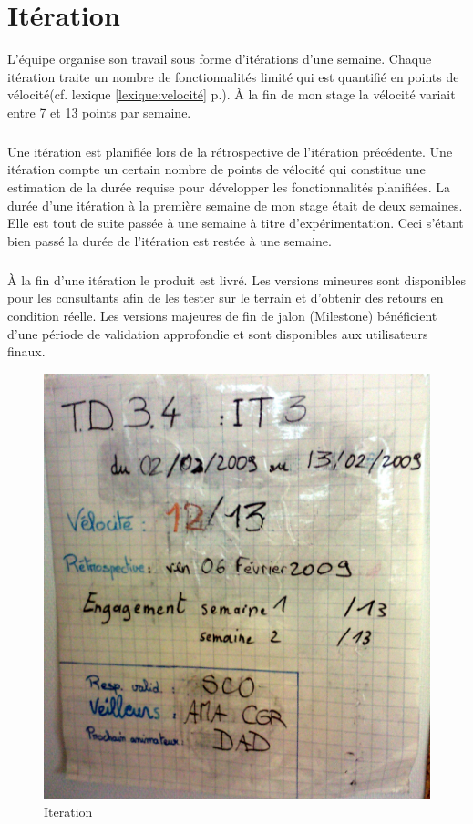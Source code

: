 \section{Itération}
L'équipe organise son travail sous forme d'itérations d'une semaine. Chaque itération traite un nombre de fonctionnalités limité qui est quantifié en points de vélocité(cf. lexique \ref{lexique:velocité} p.\pageref{lexique:velocité}). À la fin de mon stage la vélocité variait entre 7 et 13 points par semaine.
\subparagraph*{}
Une itération est planifiée lors de la rétrospective de l'itération précédente. Une itération compte un certain nombre de points de vélocité qui constitue une estimation de la durée requise pour développer les fonctionnalités planifiées. La durée d'une itération à la première semaine de mon stage était de deux semaines. Elle est tout de suite passée à une semaine à titre d'expérimentation. Ceci s'étant bien passé la durée de l'itération est restée à une semaine.
\subparagraph*{}
À la fin d'une itération le produit est livré. Les versions mineures sont disponibles pour les consultants afin de les tester sur le terrain et d'obtenir des retours en condition réelle. Les versions majeures de fin de jalon (Milestone) bénéficient d'une période de validation approfondie et sont disponibles aux utilisateurs finaux.
\begin{figure}[!ht]
\centering
\includegraphics[scale=0.10]{Illustrations/SP_A0182.jpg}
\caption{Iteration}
\label{fig:Iteration}
\end{figure}
